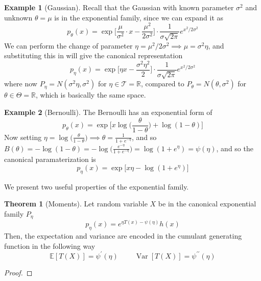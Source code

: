 \documentclass{article}
\DeclareMathOperator{\Var}{Var}
\theoremstyle{definition}
\newtheorem{theorem}{Theorem}[section]
\newtheorem{example}{Example}[section]
\theoremstyle{remark}
\theoremstyle{definition}
\begin{document}
\begin{example}[Gaussian]
Recall that the Gaussian with known parameter $\sigma^2$ and unknown $\theta = \mu$ is in the exponential family, since we can expand it as 
\[p_\theta (x) = \exp \bigg[ \frac{\mu}{\sigma^2} \cdot x - \frac{\mu^2}{2 \sigma^2} \bigg] \cdot \frac{1}{\sigma \sqrt{2\pi}} e^{x^2/2 \sigma^2}\]
We can perform the change of parameter $\eta = \mu^2 / 2\sigma^2 \implies \mu = \sigma^2 \eta$, and substituting this in will give the canonical representation 
\[p_\eta (x) = \exp \Big[ \eta x - \frac{\sigma^2 \eta^2}{2} \Big] \cdot \frac{1}{\sigma \sqrt{2\pi}} e^{x^2/2 \sigma^2}\]
where now $P_\eta = N(\sigma^2 \eta, \sigma^2)$ for $\eta \in \mathcal{T} = \mathbb{R}$, compared to $P_\theta = N(\theta, \sigma^2)$ for $\theta \in \Theta = \mathbb{R}$, which is basically the same space. 
\end{example}

\begin{example}[Bernoulli]
The Bernoulli has an exponential form of 
\[p_\theta (x) = \exp \bigg[ x \log \Big( \frac{\theta}{1 - \theta} \Big) + \log(1 - \theta)\bigg]\]
Now setting $\eta = \log\big( \frac{\theta}{1 - \theta} \big) \implies \theta = \frac{1}{1 + e^{-\eta}}$, and so $B(\theta) = - \log(1 - \theta) = - \log \big( \frac{e^{-\eta}}{1 + e^{-\eta}} \big) = \log(1 + e^\eta) = \psi(\eta)$, and so the canonical paramaterization is 
\[p_\eta (x) = \exp \big[ x \eta - \log(1 + e^{\eta}) \big]\]
\end{example}


We present two useful properties of the exponential family. 

\begin{theorem}[Moments]
Let random variable $X$ be in the canonical exponential family $P_\eta$ 
\[p_\eta (x) = e^{\eta T(x) - \psi(\eta)} h(x)\]
Then, the expectation and variance are encoded in the cumulant generating function in the following way 
\[\mathbb{E} [T(X)] = \psi^\prime (\eta) \;\;\;\;\;\;\;\; \Var[T(X)] = \psi^{\prime\prime} (\eta)\]
\end{theorem}
\begin{proof}

\end{proof}
\end{document}
